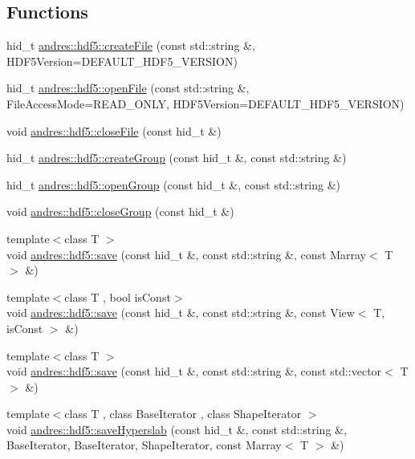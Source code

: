 \subsection*{Functions}
\begin{DoxyCompactItemize}
\item 
hid\+\_\+t \hyperlink{namespaceandres_1_1hdf5_a1f779b6e42349512d5227fbb6dcf92cd}{andres\+::hdf5\+::create\+File} (const std\+::string \&, H\+D\+F5\+Version=D\+E\+F\+A\+U\+L\+T\+\_\+\+H\+D\+F5\+\_\+\+V\+E\+R\+S\+I\+O\+N)
\item 
hid\+\_\+t \hyperlink{namespaceandres_1_1hdf5_a3645de3466468274059f8475066ff820}{andres\+::hdf5\+::open\+File} (const std\+::string \&, File\+Access\+Mode=R\+E\+A\+D\+\_\+\+O\+N\+L\+Y, H\+D\+F5\+Version=D\+E\+F\+A\+U\+L\+T\+\_\+\+H\+D\+F5\+\_\+\+V\+E\+R\+S\+I\+O\+N)
\item 
void \hyperlink{namespaceandres_1_1hdf5_afa6545825e5557eecf6ac1e8fc68bb56}{andres\+::hdf5\+::close\+File} (const hid\+\_\+t \&)
\item 
hid\+\_\+t \hyperlink{namespaceandres_1_1hdf5_ac03dd5212231c5335a0a02edb3c0d879}{andres\+::hdf5\+::create\+Group} (const hid\+\_\+t \&, const std\+::string \&)
\item 
hid\+\_\+t \hyperlink{namespaceandres_1_1hdf5_a3d7159f65f86576c9142409b08afcfc9}{andres\+::hdf5\+::open\+Group} (const hid\+\_\+t \&, const std\+::string \&)
\item 
void \hyperlink{namespaceandres_1_1hdf5_a1aaf506863ec820cdcc827c7997d4ba3}{andres\+::hdf5\+::close\+Group} (const hid\+\_\+t \&)
\item 
{\footnotesize template$<$class T $>$ }\\void \hyperlink{namespaceandres_1_1hdf5_a0bc471ab828dcfdedd90dc6f991b509e}{andres\+::hdf5\+::save} (const hid\+\_\+t \&, const std\+::string \&, const Marray$<$ T $>$ \&)
\item 
{\footnotesize template$<$class T , bool is\+Const$>$ }\\void \hyperlink{namespaceandres_1_1hdf5_ac6995803b0ec6079698d61563b5de104}{andres\+::hdf5\+::save} (const hid\+\_\+t \&, const std\+::string \&, const View$<$ T, is\+Const $>$ \&)
\item 
{\footnotesize template$<$class T $>$ }\\void \hyperlink{namespaceandres_1_1hdf5_a541f5c1613746f236ecc7e0035fa8919}{andres\+::hdf5\+::save} (const hid\+\_\+t \&, const std\+::string \&, const std\+::vector$<$ T $>$ \&)
\item 
{\footnotesize template$<$class T , class Base\+Iterator , class Shape\+Iterator $>$ }\\void \hyperlink{namespaceandres_1_1hdf5_a8b3c6fd3570f7452b1507bf5cf48dfc5}{andres\+::hdf5\+::save\+Hyperslab} (const hid\+\_\+t \&, const std\+::string \&, Base\+Iterator, Base\+Iterator, Shape\+Iterator, const Marray$<$ T $>$ \&)

\end{DoxyCompactItemize}
